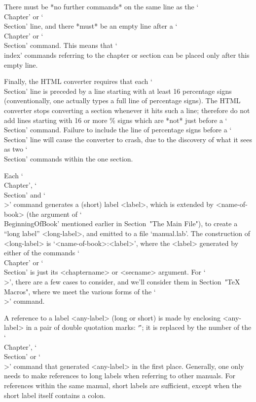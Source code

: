 There must be *no further commands* on the same line as  the  `\\Chapter'
or  `\\Section'  line,  and  there  *must*  be  an  empty  line  after  a
`\\Chapter' or `\\Section' command. This means  that  `\\index'  commands
referring to the chapter or section can be placed only after  this  empty
line.

Finally, the HTML  converter  requires  that  each  `\\Section'  line  is
preceded  by  a  line  starting  with  at  least  16   percentage   signs
(conventionally, one actually types a full line of percentage signs). The
HTML converter stops converting a section whenever it hits such  a  line;
therefore do not add lines starting with 16 or more \%  signs  which  are
*not* just before a `\\Section' command. Failure to include the  line  of
percentage signs before a `\\Section' line will cause  the  converter  to
crash, due to the discovery of what it sees as two  `\\Section'  commands
within the one section.


Each `\\Chapter', `\\Section' and `\\>' command generates a (short) label
<label>,  which  is  extended  by   <name-of-book>   (the   argument   of
`\\BeginningOfBook' mentioned earlier in  Section~"The  Main  File"),  to
create a ``long label'' <long-label>, and emitted to a file `manual.lab'.
The construction of <long-label> is `<name-of-book>:<label>',  where  the
<label> generated by either of the commands `\\Chapter' or `\\Section' is
just its <chaptername> or <secname> argument. For `\\>', there are a  few
cases to consider, and we'll consider them in Section~"TeX Macros", where
we meet the various forms of the `\\>' command.

A reference to a label <any-label> (long or short) is made  by  enclosing
<any-label> in a pair of double quotation marks: `\"<any-label>\"'; it is
replaced by the number of the `\\Chapter', `\\Section' or  `\\>'  command
that generated <any-label> in the first place. Generally, one only  needs
to make references to long labels when referring to  other  manuals.  For
references within the same manual, short labels  are  sufficient,  except
when the short label itself contains a colon.

